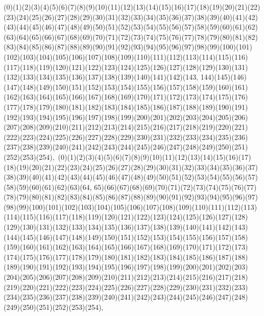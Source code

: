 \documentclass[12pt]{article}
\begin{document}
{(0)(1)(2)(3)(4)(5)(6)(7)(8)(9)(10)(11)(12)(13)(14)(15)(16)(17)(18)(19)(20)(21)(22)(23)(24)(25)(26)(27)(28)(29)(30)(31)(32)(33)(34)(35)(36)(37)(38)(39)(40)(41)(42)(43)(44)(45)(46)(47)(48)(49)(50)(51)(52)(53)(54)(55)(56)(57)(58)(59)(60)(61)(62)(63)(64)(65)(66)(67)(68)(69)(70)(71)(72)(73)(74)(75)(76)(77)(78)(79)(80)(81)(82)(83)(84)(85)(86)(87)(88)(89)(90)(91)(92)(93)(94)(95)(96)(97)(98)(99)(100)(101)(102)(103)(104)(105)(106)(107)(108)(109)(110)(111)(112)(113)(114)(115)(116)(117)(118)(119)(120)(121)(122)(123)(124)(125)(126)(127)(128)(129)(130)(131)(132)(133)(134)(135)(136)(137)(138)(139)(140)(141)(142)(143, 144)(145)(146)(147)(148)(149)(150)(151)(152)(153)(154)(155)(156)(157)(158)(159)(160)(161)(162)(163)(164)(165)(166)(167)(168)(169)(170)(171)(172)(173)(174)(175)(176)(177)(178)(179)(180)(181)(182)(183)(184)(185)(186)(187)(188)(189)(190)(191)(192)(193)(194)(195)(196)(197)(198)(199)(200)(201)(202)(203)(204)(205)(206)(207)(208)(209)(210)(211)(212)(213)(214)(215)(216)(217)(218)(219)(220)(221)(222)(223)(224)(225)(226)(227)(228)(229)(230)(231)(232)(233)(234)(235)(236)(237)(238)(239)(240)(241)(242)(243)(244)(245)(246)(247)(248)(249)(250)(251)(252)(253)(254)$
, 
$
(0)(1)(2)(3)(4)(5)(6)(7)(8)(9)(10)(11)(12)(13)(14)(15)(16)(17)(18)(19)(20)(21)(22)(23)(24)(25)(26)(27)(28)(29)(30)(31)(32)(33)(34)(35)(36)(37)(38)(39)(40)(41)(42)(43)(44)(45)(46)(47)(48)(49)(50)(51)(52)(53)(54)(55)(56)(57)(58)(59)(60)(61)(62)(63)(64, 65)(66)(67)(68)(69)(70)(71)(72)(73)(74)(75)(76)(77)(78)(79)(80)(81)(82)(83)(84)(85)(86)(87)(88)(89)(90)(91)(92)(93)(94)(95)(96)(97)(98)(99)(100)(101)(102)(103)(104)(105)(106)(107)(108)(109)(110)(111)(112)(113)(114)(115)(116)(117)(118)(119)(120)(121)(122)(123)(124)(125)(126)(127)(128)(129)(130)(131)(132)(133)(134)(135)(136)(137)(138)(139)(140)(141)(142)(143)(144)(145)(146)(147)(148)(149)(150)(151)(152)(153)(154)(155)(156)(157)(158)(159)(160)(161)(162)(163)(164)(165)(166)(167)(168)(169)(170)(171)(172)(173)(174)(175)(176)(177)(178)(179)(180)(181)(182)(183)(184)(185)(186)(187)(188)(189)(190)(191)(192)(193)(194)(195)(196)(197)(198)(199)(200)(201)(202)(203)(204)(205)(206)(207)(208)(209)(210)(211)(212)(213)(214)(215)(216)(217)(218)(219)(220)(221)(222)(223)(224)(225)(226)(227)(228)(229)(230)(231)(232)(233)(234)(235)(236)(237)(238)(239)(240)(241)(242)(243)(244)(245)(246)(247)(248)(249)(250)(251)(252)(253)(254)$
, 
$
}
\end{document}
